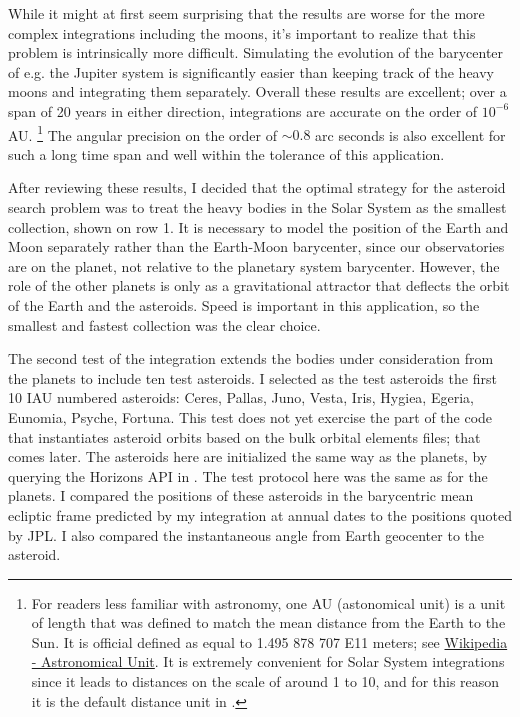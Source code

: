 While it might at first seem surprising that the results are worse for the more complex integrations including the moons,
it's important to realize that this problem is intrinsically more difficult.
Simulating the evolution of the barycenter of e.g. the Jupiter system is significantly easier than keeping track of the heavy moons and integrating them separately.
Overall these results are excellent; over a span of 20 years in either direction, integrations are accurate on the order of $10^{-6}$ AU.
\footnote{For readers less familiar with astronomy, one AU (astonomical unit) is a unit of length that was defined to match the mean distance from the Earth to the Sun.
It is official defined as equal to 1.495 878 707 E11 meters; see \href{https://en.wikipedia.org/wiki/Astronomical_unit}{Wikipedia - Astronomical Unit}.
It is extremely convenient for Solar System integrations since it leads to distances on the scale of around 1 to 10, 
and for this reason it is the default distance unit in .}
The angular precision on the order of $\sim 0.8$ arc seconds is also excellent for such a long time span and well within the tolerance of this application.

After reviewing these results, I decided that the optimal strategy for the asteroid search problem was to treat the heavy bodies 
in the Solar System as the smallest collection, shown on row 1.
It is necessary to model the position of the Earth and Moon separately rather than the Earth-Moon barycenter, 
since our observatories are on the planet, not relative to the planetary system barycenter.
However, the role of the other planets is only as a gravitational attractor that deflects the orbit of the Earth and the asteroids.
Speed is important in this application, so the smallest and fastest collection was the clear choice.

The second test of the integration extends the bodies under consideration from the planets to include ten test asteroids.
I selected as the test asteroids the first 10 IAU numbered asteroids: Ceres, Pallas, Juno, Vesta, Iris, Hygiea, Egeria, Eunomia, Psyche, Fortuna.
This test does not yet exercise the part of the code that instantiates asteroid orbits based on the bulk orbital elements files; that comes later.
The asteroids here are initialized the same way as the planets, by querying the Horizons API in .
The test protocol here was the same as for the planets.
I compared the positions of these asteroids in the barycentric mean ecliptic frame predicted by my integration at annual dates to the positions quoted by JPL.
I also compared the instantaneous angle from Earth geocenter to the asteroid.

